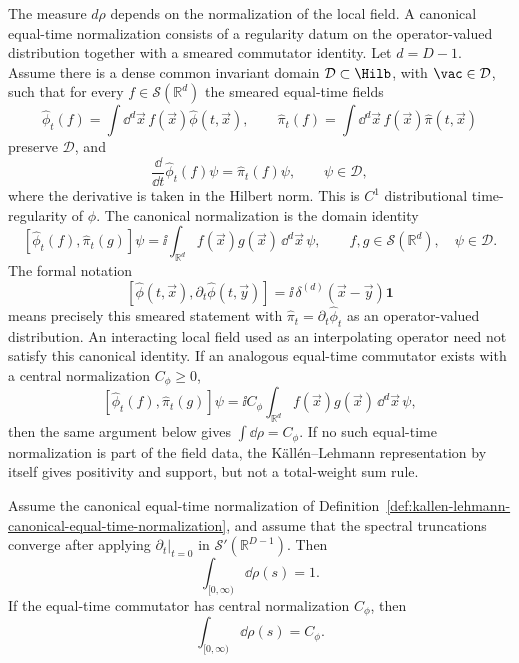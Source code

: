 \begin{definition}
\label{def:kallen-lehmann-canonical-equal-time-normalization}
The measure \(d\rho\) depends on the normalization of the local field.  A
canonical equal-time normalization consists of a regularity datum on the
operator-valued distribution together with a smeared commutator identity.
Let \(d=D-1\).  Assume there is a dense common invariant domain
\(\mathcal D\subset\Hilb\), with \(\vac\in\mathcal D\), such that for every
\(f\in\mathcal S(\mathbb R^d)\) the smeared equal-time fields
\[
  \widehat\phi_t(f)=\int\dd^d\vec x\,f(\vec x)\widehat\phi(t,\vec x),
  \qquad
  \widehat\pi_t(f)=\int\dd^d\vec x\,f(\vec x)\widehat\pi(t,\vec x)
\]
preserve \(\mathcal D\), and
\[
  \frac{\dd}{\dd t}\widehat\phi_t(f)\psi
  =
  \widehat\pi_t(f)\psi,
  \qquad \psi\in\mathcal D,
\]
where the derivative is taken in the Hilbert norm.  This is \(C^1\)
distributional time-regularity of \(\widehat\phi\).  The canonical
normalization is the domain identity
\[
  [\widehat\phi_t(f),\widehat\pi_t(g)]\psi
  =
  \ii\int_{\mathbb R^d} f(\vec x)g(\vec x)\,\dd^d\vec x\,\psi,
  \qquad f,g\in\mathcal S(\mathbb R^d),\quad \psi\in\mathcal D .
\]
The formal notation
\[
  [\widehat\phi(t,\vec x),\partial_t\widehat\phi(t,\vec y)]
  =
  \ii\,\delta^{(d)}(\vec x-\vec y)\mathbf 1
\]
means precisely this smeared statement with
\(\widehat\pi_t=\partial_t\widehat\phi_t\) as an operator-valued distribution.
An interacting local field used as an interpolating operator need not satisfy
this canonical identity.  If an analogous equal-time commutator exists with a
central normalization \(C_\phi\ge0\),
\[
  [\widehat\phi_t(f),\widehat\pi_t(g)]\psi
  =
  \ii C_\phi
  \int_{\mathbb R^d} f(\vec x)g(\vec x)\,\dd^d\vec x\,\psi ,
\]
then the same argument below gives \(\int\dd\rho=C_\phi\).  If no such
equal-time normalization is part of the field data, the K\"all\'en--Lehmann
representation by itself gives positivity and support, but not a total-weight
sum rule.
\end{definition}

\begin{proposition}
\label{prop:kallen-lehmann-canonical-spectral-sum-rule}
Assume the canonical equal-time normalization of
Definition~\ref{def:kallen-lehmann-canonical-equal-time-normalization}, and
assume that the spectral truncations converge after applying
\(\partial_t|_{t=0}\) in \(\mathcal S'(\mathbb R^{D-1})\).  Then
\[
  \int_{[0,\infty)}\dd\rho(s)=1 .
\]
If the equal-time commutator has central normalization \(C_\phi\), then
\[
  \int_{[0,\infty)}\dd\rho(s)=C_\phi .
\]
\end{proposition}

